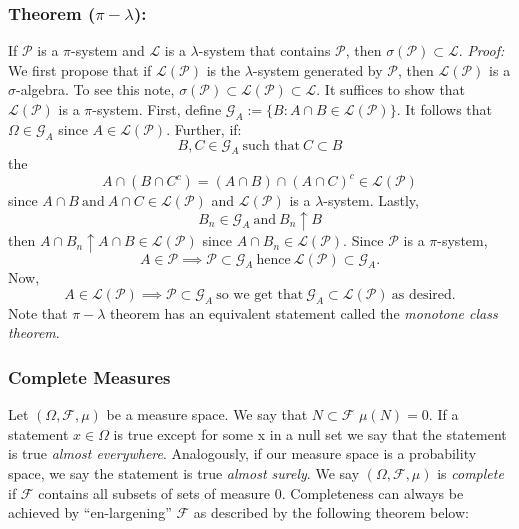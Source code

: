 \documentclass{article}
\begin{document}
\subsubsection{Theorem ($\pi-\lambda$):}
If $\mathcal{P}$ is a $\pi$-system and $\mathcal{L}$ is a $\lambda$-system that contains $\mathcal{P}$, then $\sigma(\mathcal{P})\subset\mathcal{L}$. \newline \newline 
\textit{Proof:} \newline \newline
We first propose that if  $\mathcal{L}(\mathcal{P})$ is the $\lambda$-system generated by $\mathcal{P}$, then $\mathcal{L}(\mathcal{P})$ is a $\sigma$-algebra. To see this note, $\sigma(\mathcal{P})\subset \mathcal{L}(\mathcal{P})\subset \mathcal{L}$. It suffices to show that $\mathcal{L}(\mathcal{P})$ is a $\pi$-system.\newline \newline
First, define $\mathcal{G}_A :=\{B:A\cap B\in \mathcal{L}(\mathcal{P})\}$. \newline \newline
It follows that $\Omega \in \mathcal{G}_A$ since $A \in  \mathcal{L}(\mathcal{P})$. Further, if:
\[
B,C \in \mathcal{G}_A \ \text{such that} \ C \subset B
\] 
the
\[
A \cap (B\cap C^c) = (A\cap B) \cap (A\cap C)^c \in \mathcal{L}(\mathcal{P})
\]
since $A\cap B \ \text{and}\  A\cap C \in \mathcal{L}(\mathcal{P})$ and $\mathcal{L}(\mathcal{P})$ is a $\lambda$-system. \newline \newline
Lastly, 
\[
B_n \in \mathcal{G}_A \ \text{and} \ B_n \uparrow B
\]
then $A \cap B_n \uparrow A \cap B \in \mathcal{L}(\mathcal{P})$ since $A \cap B_n \in \mathcal{L}(\mathcal{P})$.
Since $\mathcal{P}$ is a $\pi$-system, 
\[
A \in \mathcal{P} \implies \mathcal{P} \subset\mathcal{G}_A \ \text{hence} \ \mathcal{L}(\mathcal{P}) \subset\mathcal{G}_A.
\]
Now,
\[
A \in \mathcal{L}(\mathcal{P}) \implies \mathcal{P} \subset\mathcal{G}_A \ \text{so we get that} \ \mathcal{G}_A \subset \mathcal{L}(\mathcal{P}) \  \text{as desired.}
\]
Note that $\pi-\lambda$ theorem has an equivalent statement called the \emph{monotone class theorem}.

\subsubsection{Complete Measures}
Let $(\Omega, \mathcal{F}, \mu)$ be a measure space. We say that $N\subset\mathcal{F}$  $\mu(N) = 0$. \newline \newline
If a statement $x\in \Omega$ is true except for some x in a null set we say that the statement is true \textit{almost everywhere}. Analogously, if our measure space is a probability space, we say the statement is true \emph{almost surely}. \newline \newline
We say $(\Omega, \mathcal{F}, \mu)$ is \emph{complete} if  $\mathcal{F}$ contains all subsets of sets of measure 0. Completeness can always be achieved by ``en-largening'' $\mathcal{F}$ as described by the following theorem below:
\end{document}
